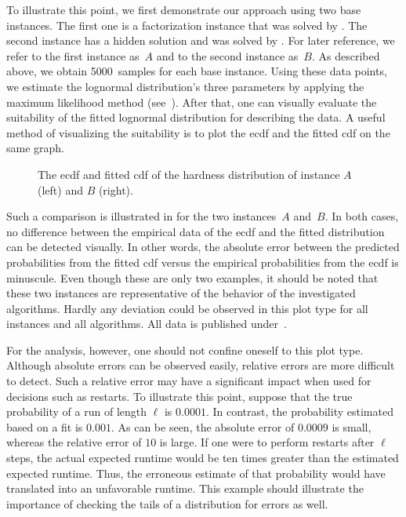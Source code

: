 To illustrate this point, we first demonstrate our approach using two base instances. The first one is a factorization instance that was solved by \SRWA{}. The second instance has a hidden solution and was solved by \probSAT{}. For later reference, we refer to the first instance as~$A$ and to the second instance as~$B$. As described above, we obtain 5000~samples for each base instance. Using these data points, we estimate the lognormal distribution's three parameters by applying the maximum likelihood method (see~\cite{AllData}). After that, one can visually evaluate the suitability of the fitted lognormal distribution for describing the data. A useful method of visualizing the suitability is to plot the ecdf and the fitted cdf on the same graph.


\begin{figure}[htb]
	\centering
	\begin{subfigure}[b]{.465\linewidth}
		\centering
		
	\end{subfigure}%
	\hfill%
	\begin{subfigure}[b]{.465\linewidth}
		\centering
		
	\end{subfigure}%
	\caption{%
		The ecdf and fitted cdf of the hardness distribution %
		of instance $A$ (left) and $B$ (right).
	}
	\label{fig:cdf-ecdf}
\end{figure}
Such a comparison is illustrated in  for the two instances~$A$ and~$B$. In both cases, no difference between the empirical data of the ecdf and the fitted distribution can be detected visually. In other words, the absolute error between the predicted probabilities from the fitted cdf versus the empirical probabilities from the ecdf is minuscule. Even though these are only two examples, it should be noted that these two instances are representative of the behavior of the investigated algorithms. Hardly any deviation could be observed in this plot type for all instances and all algorithms. All data is published under~\cite{AllData}.

For the analysis, however, one should not confine oneself to this plot type. Although absolute errors can be observed easily, relative errors are more difficult to detect. Such a relative error may have a significant impact when used for decisions such as restarts. To illustrate this point, suppose that the true probability of a run of length $\ell$ is $0.0001$. In contrast, the probability estimated based on a fit is $0.001$. As can be seen, the absolute error of $0.0009$ is small, whereas the relative error of $10$ is large. If one were to perform restarts after $\ell$ steps, the actual expected runtime would be ten times greater than the estimated expected runtime. Thus, the erroneous estimate of that probability would have translated into an unfavorable runtime. This example should illustrate the importance of checking the tails of a distribution for errors as well. 

